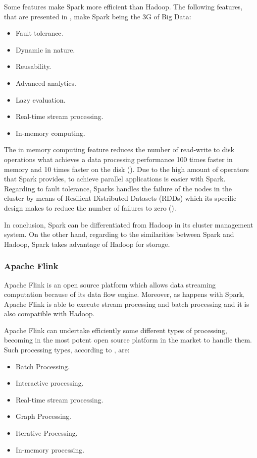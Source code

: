 Some features make Spark more efficient than Hadoop. The following features, that are presented in \cite{sparkwebsite}, make Spark being the 3G of Big Data:

\begin{itemize}

\item Fault tolerance.
\item Dynamic in nature.
\item Reusability.
\item Advanced analytics.
\item Lazy evaluation.
\item Real-time stream processing.
\item In-memory computing.

\end{itemize}

The in memory computing feature reduces the number of read-write to disk operations what achieves a data processing performance 100 times faster in memory and 10 times faster on the disk (\cite{sparkwebsite}). Due to the high amount of operators that Spark provides, to achieve parallel applications is easier with Spark. Regarding to fault tolerance, Sparks handles the failure of the nodes in the cluster by means of Resilient Distributed Datasets (RDDs) which its specific design makes to reduce the number of failures to zero (\cite{sparkwebsite}).

In conclusion, Spark can be differentiated from Hadoop in its cluster management system. On the other hand, regarding to the similarities between Spark and Hadoop, Spark takes advantage of Hadoop for storage.

\subsubsection{Apache Flink}

Apache Flink is an open source platform which allows data streaming computation because of its data flow engine. Moreover, as happens with Spark, Apache Flink is able to execute stream processing and batch processing and it is also compatible with Hadoop.

Apache Flink can undertake efficiently some different types of processing, becoming in the most potent open source platform in the market to handle them. Such processing types, according to \cite{flinkwebsite}, are:

\begin{itemize}

\item Batch Processing.
\item Interactive processing.
\item Real-time stream processing.
\item Graph Processing.
\item Iterative Processing.
\item In-memory processing.

\end{itemize}

